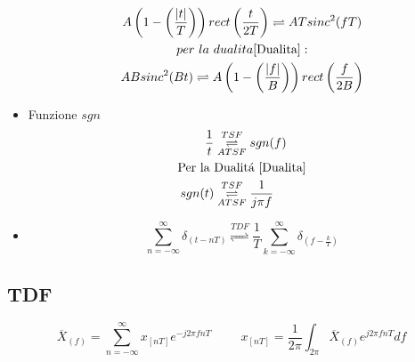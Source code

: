 \begin{itemize}
{\begin{gather}
                    A\left(1-\left(\frac{|t|}{T}\right)\right)rect \left(\frac{t}{2T}\right) \rightleftharpoons ATsinc^2(fT)\nonumber\\
                    per\ la\ dualita \ref{Dualita}: \nonumber \\
                    ABsinc^2(Bt) \rightleftharpoons A\left(1-\left(\frac{|f|}{B}\right)\right)rect \left(\frac{f}{2B}\right) \nonumber
                \end{gather}                
            }
            \item {Funzione $sgn$\\
                \begin{align}
                    \frac{1}{t} &\overunderset{TSF}{ATSF}{\rightleftharpoons}  sgn(f) \nonumber \\
                    \text{Per la }&\text{Dualitá \ref{Dualita}}\nonumber \\
                    sgn(t) &\overunderset{TSF}{ATSF}{\rightleftharpoons} \frac{1}{j\pi f} \nonumber
                \end{align}
            }
            \item{
                \[\sum_{n=-\infty}^{\infty}\delta_{(t-nT)} \overset{TDF}{\rightleftharpoons} \frac{1}{T} \sum_{k=-\infty}^{\infty} \delta_{(f-\frac{k}{T})}\nonumber\]
            }
        \end{itemize} 
    \subsection{TDF}
        \[
            \overline{X}_{(f)} = \sum_{n=-\infty}^{\infty} x_{[nT]}e^{-j2\pi fnT} \hspace{1cm} x_{[nT]} = \frac{1}{2\pi} \int_{2\pi} \overline{X}_{(f)}e^{j2\pi fnT} df
        \]
